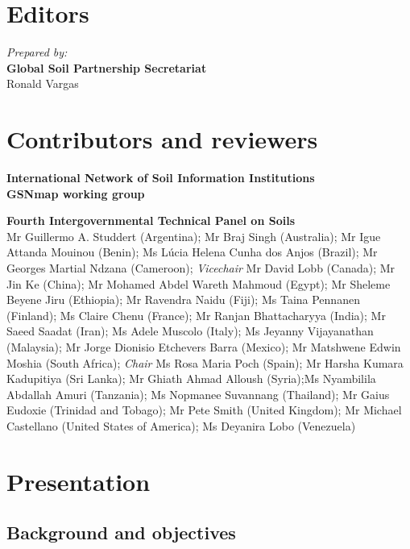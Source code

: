 \documentclass[
  10pt,
  b5paper,
  oneside]{book}
\begin{document}
\hypertarget{editors}{%
\chapter*{Editors}\label{editors}}

\emph{Prepared by:}\\
\textbf{Global Soil Partnership Secretariat}\\
Ronald Vargas\\

\hypertarget{contributors-and-reviewers}{%
\chapter*{Contributors and reviewers}\label{contributors-and-reviewers}}

\textbf{International Network of Soil Information Institutions}\\

\textbf{GSNmap working group}

\textbf{Fourth Intergovernmental Technical Panel on Soils}\\
Mr Guillermo A. Studdert (Argentina); Mr Braj Singh (Australia); Mr Igue Attanda Mouinou (Benin); Ms Lúcia Helena Cunha dos Anjos (Brazil); Mr Georges Martial Ndzana (Cameroon); \emph{Vicechair} Mr David Lobb (Canada); Mr Jin Ke (China); Mr Mohamed Abdel Wareth Mahmoud (Egypt); Mr Sheleme Beyene Jiru (Ethiopia); Mr Ravendra Naidu (Fiji); Ms Taina Pennanen (Finland); Ms Claire Chenu (France); Mr Ranjan Bhattacharyya (India); Mr Saeed Saadat (Iran); Ms Adele Muscolo (Italy); Ms Jeyanny Vijayanathan (Malaysia); Mr Jorge Dionisio Etchevers Barra (Mexico); Mr Matshwene Edwin Moshia (South Africa); \emph{Chair} Ms Rosa Maria Poch (Spain); Mr Harsha Kumara Kadupitiya (Sri Lanka); Mr Ghiath Ahmad Alloush (Syria);Ms Nyambilila Abdallah Amuri (Tanzania); Ms Nopmanee Suvannang (Thailand); Mr Gaius Eudoxie (Trinidad and Tobago); Mr Pete Smith (United Kingdom); Mr Michael Castellano (United States of America); Ms Deyanira Lobo (Venezuela)\\

\mainmatter

\hypertarget{presentation}{%
\chapter{Presentation}\label{presentation}}

\hypertarget{background-and-objectives}{%
\section{Background and objectives}\label{background-and-objectives}}
\end{document}
